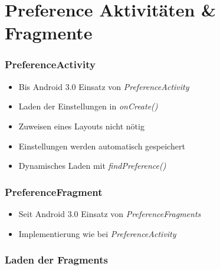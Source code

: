 \section{Preference Aktivitäten \& Fragmente}
\begin{frame}
   \frametitle{PreferenceActivity}
   \begin{itemize}
      \item Bis Android 3.0 Einsatz von \emph{PreferenceActivity}
      \item Laden der Einstellungen in \emph{onCreate()}
      \item Zuweisen eines Layouts nicht nötig
      \item Einstellungen werden automatisch gespeichert
      \item Dynamisches Laden mit \emph{findPreference()}
   \end{itemize}

   
\end{frame}

\begin{frame}
   \frametitle{PreferenceFragment}
   \begin{itemize}
      \item Seit Android 3.0 Einsatz von \emph{PreferenceFragments}
      \item Implementierung wie bei \emph{PreferenceActivity}
   \end{itemize}

   
\end{frame}

\begin{frame}
   \frametitle{Laden der Fragments}
   
\end{frame}

